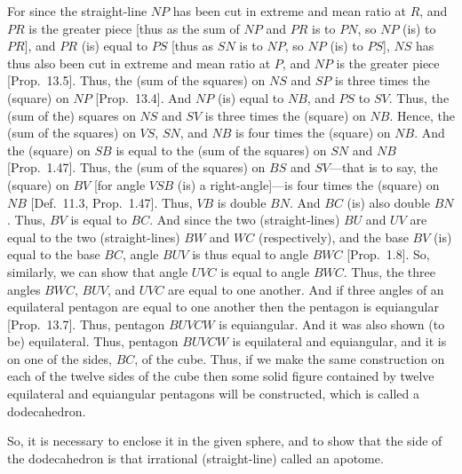 \begin{Parallel}{}{}
{For since the straight-line $NP$ has been cut in extreme and mean ratio at
$R$, and $PR$ is the greater piece [thus as the sum of
$NP$ and $PR$ is to $PN$, so $NP$ (is) to $PR$], and $PR$
(is) equal to $PS$ [thus as $SN$ is to $NP$, so $NP$ (is) to $PS$], 
$NS$ has thus also been cut in extreme and mean ratio at $P$, and $NP$
is the greater piece [Prop.~13.5]. Thus, the (sum of the squares) on
$NS$ and $SP$ is three times the (square) on $NP$ [Prop.~13.4].
And $NP$ (is) equal to $NB$, and $PS$ to $SV$. Thus, the (sum of the)
squares on  $NS$ and $SV$ is three times the (square) on $NB$.
Hence, the (sum of the squares) on $VS$, $SN$, and $NB$
is four times the (square) on $NB$. And the (square) on $SB$
is equal to the (sum of the squares) on
$SN$ and $NB$  [Prop.~1.47].
Thus, the (sum of the squares) on $BS$ and $SV$---that is to say, 
the (square) on $BV$ [for angle $VSB$ (is) a right-angle]---is
four times the (square) on $NB$ [Def.~11.3, Prop.~1.47].
Thus, $VB$ is double $BN$. And $BC$ (is) also double $BN$.
Thus, $BV$ is equal to $BC$. And since the two (straight-lines)
$BU$ and $UV$ are equal to the two (straight-lines)
$BW$ and $WC$ (respectively), and the base $BV$ (is) equal to
the base $BC$, angle $BUV$ is thus equal to angle $BWC$ [Prop.~1.8].
So, similarly, we can show that angle $UVC$ is equal to angle
$BWC$.  Thus, the three angles
$BWC$, $BUV$, and $UVC$ are equal to one another.
And if three angles of an equilateral pentagon are equal to one another
then the pentagon is equiangular [Prop.~13.7].  Thus, pentagon
$BUVCW$ is equiangular. And it was also shown (to be)
equilateral. Thus, pentagon $BUVCW$ is equilateral and equiangular,
and it is on one of the sides, $BC$, of the cube. Thus, if we make the
same construction on each of the twelve sides of the cube then some solid
figure contained by twelve equilateral and equiangular pentagons 
will be constructed,  which is called a dodecahedron.

So, it is necessary to enclose it in the given sphere, and to show that the
side of the dodecahedron is that irrational (straight-line) called an apotome.

}
\end{Parallel}
